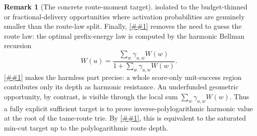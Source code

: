 \documentclass[10pt]{article}
\newcommand{\cref}[1]{\ref{##1}}
\newcommand{\Cref}[1]{\ref{##1}}
\theoremstyle{definition}
\newtheorem{remark}[theorem]{Remark}
\begin{document}
\begin{remark}[The concrete route-moment target]
   isolated to the budget-thinned or fractional-delivery opportunities where
   activation probabilities are genuinely smaller than the route-law split.
   Finally, \cref{lem:optimal-prefix-energy-law} removes the need to guess the
   route law: the optimal prefix-energy law is computed by the harmonic
   Bellman recursion
   \[
      W(u)=
      \frac{\sum_w\gamma_{u,w}W(w)}
           {1+\sum_w\gamma_{u,w}W(w)}.
   \]
   \Cref{lem:unit-success-skeleton-contraction} makes the harmless part
   precise: a whole score-only unit-success region contributes only its depth
   as harmonic resistance.  An underfunded geometric opportunity, by contrast,
   is visible through the local sum
   $\sum_w\gamma_{u,w}W(w)$. Thus a fully explicit sufficient target is to
   prove inverse-polylogarithmic harmonic value at the root of the tame-route
   trie. By \cref{lem:harmonic-saturated-comparison}, this is equivalent to
   the saturated min-cut target up to the polylogarithmic route depth.
\end{remark}
\end{document}
